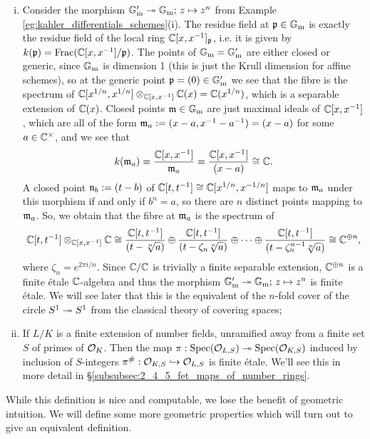 \begin{eg}
	\label{eg:finite_etale_morphisms}
	\begin{enumerate}[(i)]
		\item Consider the morphism $\mathbb{G}_{\mathrm{m}}' \twoheadrightarrow \mathbb{G}_{\mathrm{m}};\, z \mapsto z^n$ from Example \ref{eg:kahler_differentials_schemes}(i). The residue field at $\mathfrak{p} \in \mathbb{G}_{\mathrm{m}}$ is exactly the residue field of the local ring $\mathbb{C}[x,x^{-1}]_{\mathfrak{p}}$, i.e. it is given by $k(\mathfrak{p}) = \mathrm{Frac}(\mathbb{C}[x,x^{-1}]/\mathfrak{p})$. The points of $\mathbb{G}_{\mathrm{m}} = \mathbb{G}_{\mathrm{m}}'$ are either closed or generic, since $\mathbb{G}_{\mathrm{m}}$ is dimension 1 (this is just the Krull dimension for affine schemes), so at the generic point $\mathfrak{p} = (0) \in \mathbb{G}_{\mathrm{m}}'$ we see that the fibre is the spectrum of $\mathbb{C}[x^{1/n}, x^{1/n}] \otimes_{\mathbb{C}[x,x^{-1}]} \mathbb{C}(x) = \mathbb{C}(x^{1/n})$, which is a separable extension of $\mathbb{C}(x)$. Closed points $\mathfrak{m} \in \mathbb{G}_{\mathrm{m}}$ are just maximal ideals of $\mathbb{C}[x,x^{-1}]$, which are all of the form $\mathfrak{m}_a := (x-a, x^{-1} - a^{-1}) = (x-a)$ for some $a \in \mathbb{C}^\times$, and we see that 
			\[
				k(\mathfrak{m}_a) = \frac{\mathbb{C}[x, x^{-1}]}{\mathfrak{m}_a} = \frac{\mathbb{C}[x,x^{-1}]}{(x-a)} \cong \mathbb{C}.
			\]
		A closed point $\mathfrak{n}_b := (t-b)$ of $\mathbb{C}[t,t^{-1}] \cong \mathbb{C}[x^{1/n}, x^{-1/n}]$ maps to $\mathfrak{m}_a$ under this morphism if and only if $b^n = a$, so there are $n$ distinct points mapping to $\mathfrak{m}_a$. So, we obtain that the fibre at $\mathfrak{m}_a$ is the spectrum of 
		\[
			\mathbb{C}[t, t^{-1}] \otimes_{\mathbb{C}[x,x^{-1}]} \mathbb{C} \cong \frac{\mathbb{C}[t, t^{-1}]}{(t-\sqrt[n]{a})} \oplus \frac{\mathbb{C}[t, t^{-1}]}{(t-\zeta_n\sqrt[n]{a})} \oplus \cdots \oplus \frac{\mathbb{C}[t, t^{-1}]}{(t-\zeta_n^{n-1}\sqrt[n]{a})} \cong \mathbb{C}^{\oplus n},
		\]
		where $\zeta_n = e^{2\pi i/n}$. Since $\mathbb{C}/\mathbb{C}$ is trivially a finite separable extension, $\mathbb{C}^{\oplus n}$ is a finite \'etale $\mathbb{C}$-algebra and thus the morphism $\mathbb{G}_{\mathrm{m}}' \twoheadrightarrow \mathbb{G}_{\mathrm{m}};\, z \mapsto z^n$ is finite \'etale. We will see later that this is the equivalent of the $n$-fold cover of the circle $S^1 \twoheadrightarrow S^1$ from the classical theory of covering spaces;
		\item If $L/K$ is a finite extension of number fields, unramified away from a finite set $S$ of primes of $\mathcal{O}_K$. Then the map $\pi : \mathrm{Spec}(\mathcal{O}_{L,S}) \twoheadrightarrow \mathrm{Spec}(\mathcal{O}_{K,S})$ induced by inclusion of $S$-integers $\pi^{\#}: \mathcal{O}_{K,S} \hookrightarrow \mathcal{O}_{L,S}$ is finite \'etale. We'll see this in more detail in \S\ref{subsubsec:2_4_5_fet_maps_of_number_rings}.
	\end{enumerate}
\end{eg}

While this definition is nice and computable, we lose the benefit of geometric intuition. We will define some more geometric properties which will turn out to give an equivalent definition.

